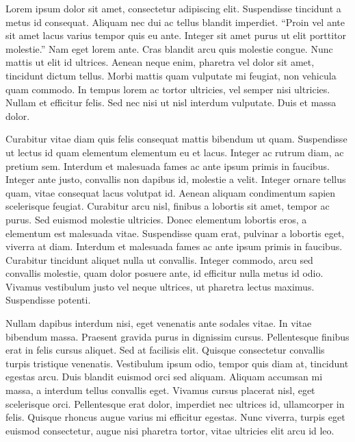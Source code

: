 \documentclass[a4paper,12pt]{article}
\begin{document}

Lorem ipsum dolor sit amet, consectetur adipiscing elit. Suspendisse tincidunt a metus id consequat. Aliquam nec dui ac tellus blandit imperdiet. ``Proin vel ante sit amet lacus varius tempor quis eu ante. Integer sit amet purus ut elit porttitor molestie.'' \citep{machado} Nam eget lorem ante. Cras blandit arcu quis molestie congue. Nunc mattis ut elit id ultrices. Aenean neque enim, pharetra vel dolor sit amet, tincidunt dictum tellus. Morbi mattis quam vulputate mi feugiat, non vehicula quam commodo. In tempus lorem ac tortor ultricies, vel semper nisi ultricies. Nullam et efficitur felis. Sed nec nisi ut nisl interdum vulputate. Duis et massa dolor.

\begin{longcitation}
Curabitur vitae diam quis felis consequat mattis bibendum ut quam. Suspendisse ut lectus id quam elementum elementum eu et lacus. Integer ac rutrum diam, ac pretium sem. Interdum et malesuada fames ac ante ipsum primis in faucibus. Integer ante justo, convallis non dapibus id, molestie a velit. Integer ornare tellus quam, vitae consequat lacus volutpat id. Aenean aliquam condimentum sapien scelerisque feugiat. Curabitur arcu nisl, finibus a lobortis sit amet, tempor ac purus. Sed euismod molestie ultricies. Donec elementum lobortis eros, a elementum est malesuada vitae. Suspendisse quam erat, pulvinar a lobortis eget, viverra at diam. Interdum et malesuada fames ac ante ipsum primis in faucibus. Curabitur tincidunt aliquet nulla ut convallis. Integer commodo, arcu sed convallis molestie, quam dolor posuere ante, id efficitur nulla metus id odio. Vivamus vestibulum justo vel neque ultrices, ut pharetra lectus maximus. Suspendisse potenti. \citep[p.80]{machado}
\end{longcitation}

Nullam dapibus interdum nisi, eget venenatis ante sodales vitae. In vitae bibendum massa. Praesent gravida purus in dignissim cursus. Pellentesque finibus erat in felis cursus aliquet. Sed at facilisis elit. Quisque consectetur convallis turpis tristique venenatis. Vestibulum ipsum odio, tempor quis diam at, tincidunt egestas arcu. Duis blandit euismod orci sed aliquam. Aliquam accumsan mi massa, \cite{machado} a interdum tellus convallis eget. Vivamus cursus placerat nisl, eget scelerisque orci. Pellentesque erat dolor, imperdiet nec ultrices id, ullamcorper in felis. Quisque rhoncus augue varius mi efficitur egestas. Nunc viverra, turpis eget euismod consectetur, augue nisi pharetra tortor, vitae ultricies elit arcu id leo.


\end{document}
